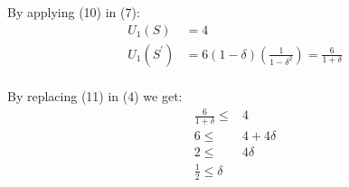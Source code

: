 \documentclass[
  course = {{IE579 Game Theory and Multi-Agent Reinforcement Learning}},
  quartile = {{4}},
  assignment = 2,
  name = {{Mohammad Mahdi Rahimi}},
  studentnumber = {{20208244}},
  email = {{mahi@kaist.ac.kr}},
  firstexercise = 1
]{aga-homework}
\begin{document}
By applying (10) in (7):\\
\begin{equation} \label{eq1}
\begin{split}
U_1(S) & = 4\\
U_1(S^\prime) & = 6(1 - \delta)(\frac{1}{1 - \delta^2}) = \frac{6}{1 + \delta}
\end{split}
\end{equation}\\
By replacing (11) in (4) we get:
\begin{equation} \label{eq1}
\begin{split}
\frac{6}{1 + \delta} \le & 4\\
6 \le & 4 + 4\delta\\
2 \le & 4\delta\\
\frac{1}{2} \le \delta
\end{split}
\end{equation}\\
\end{document}
